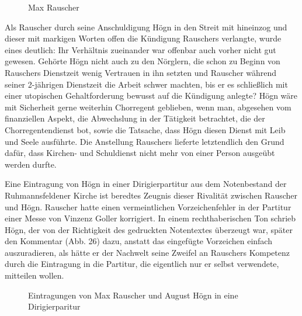 \begin{figure}
\caption{Max Rauscher}
\end{figure}

Als Rauscher durch seine Anschuldigung Högn in den Streit mit hineinzog
und dieser mit markigen Worten offen die Kündigung Rauschers verlangte,
wurde eines deutlich: Ihr Verhältnis zueinander war offenbar auch
vorher nicht gut gewesen. Gehörte Högn nicht auch zu den Nörglern, die
schon zu Beginn von Rauschers Dienstzeit wenig Vertrauen in ihn setzten
und Rauscher während seiner 2-jährigen Dienstzeit die Arbeit schwer
machten, bis er es schließlich mit einer utopischen Gehaltforderung
bewusst auf die Kündigung anlegte? Högn wäre mit Sicherheit gerne
weiterhin Chorregent geblieben, wenn man, abgesehen vom finanziellen
Aspekt, die Abwechslung in der Tätigkeit betrachtet, die der
Chorregentendienst bot, sowie die Tatsache, dass Högn diesen Dienst mit
Leib und Seele ausführte. Die Anstellung Rauschers lieferte
letztendlich den Grund dafür, dass Kirchen- und Schuldienst nicht mehr
von einer Person ausgeübt werden durfte.

Eine Eintragung von Högn in einer Dirigierpartitur aus dem Notenbestand
der Ruhmannsfeldener Kirche ist beredtes Zeugnis dieser Rivalität
zwischen Rauscher und Högn. Rauscher hatte einen vermeintlichen
Vorzeichenfehler in der Partitur einer Messe von Vinzenz Goller
korrigiert. In einem rechthaberischen Ton schrieb Högn, der von der
Richtigkeit des gedruckten Notentextes überzeugt war, später den
Kommentar (Abb. 26) dazu, anstatt das eingefügte Vorzeichen einfach
auszuradieren, als hätte er der Nachwelt seine Zweifel an Rauschers
Kompetenz durch die Eintragung in die Partitur, die eigentlich nur er
selbst verwendete, mitteilen wollen.

\begin{figure}
\caption{Eintragungen von Max Rauscher und August Högn in eine Dirigierparitur}
\end{figure}


